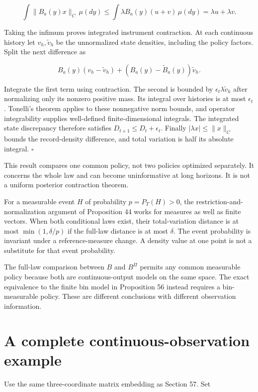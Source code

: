 \[
\int\|B_a(y)x\|_C\,\mu(dy)
\leq\int\lambda B_a(y)(u+v)\,\mu(dy)
=\lambda u+\lambda v.
\]

Taking the infimum proves integrated instrument contraction. At each
continuous history let \(v_h,\widetilde v_h\) be the unnormalized state
densities, including the policy factors. Split the next difference as

\[
B_a(y)(v_h-\widetilde v_h)
+(B_a(y)-\widetilde B_a(y))\widetilde v_h.
\]

Integrate the first term using contraction. The second is bounded by
\(\epsilon_t\lambda\widetilde v_h\) after normalizing only its nonzero
positive mass. Its integral over histories is at most \(\epsilon_t\).
Tonelli's theorem applies to these nonnegative norm bounds, and operator
integrability supplies well-defined finite-dimensional integrals. The
integrated state discrepancy therefore satisfies
\(D_{t+1}\leq D_t+\epsilon_t\). Finally \(|\lambda x|\leq\|x\|_C\)
bounds the record-density difference, and total variation is half its
absolute integral. \(\square\)

This result compares one common policy, not two policies optimized
separately. It concerns the whole law and can become uninformative at
long horizons. It is not a uniform posterior contraction theorem.

For a measurable event \(H\) of probability \(p=P_T(H)>0\), the
restriction-and-normalization argument of Proposition 44 works for
measures as well as finite vectors. When both conditional laws exist,
their total-variation distance is at most \(\min(1,\delta/p)\) if the
full-law distance is at most \(\delta\). The event probability is
invariant under a reference-measure change. A density value at one point
is not a substitute for that event probability.

The full-law comparison between \(B\) and \(B^\Pi\) permits any common
measurable policy because both are continuous-output models on the same
space. The exact equivalence to the finite bin model in Proposition 56
instead requires a bin-measurable policy. These are different
conclusions with different observation information.

\section{A complete continuous-observation example}\label{LSM:a-complete-continuous-observation-example}

Use the same three-coordinate matrix embedding as Section 57. Set

